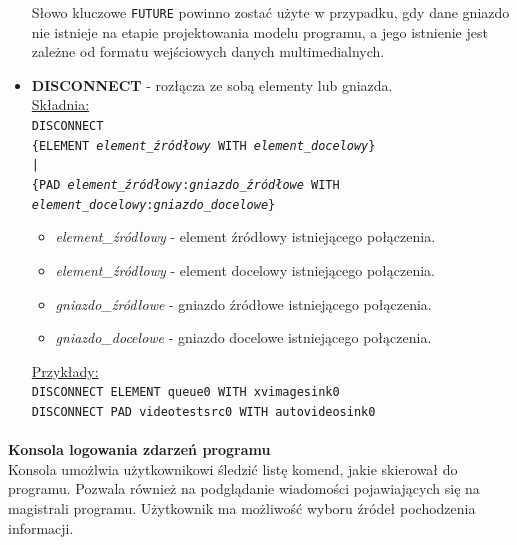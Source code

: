 \documentclass[12pt]{article}
\begin{document}
\begin{itemize}
Słowo kluczowe \texttt{FUTURE} powinno zostać użyte w przypadku, gdy dane gniazdo nie istnieje na etapie projektowania modelu programu, a jego istnienie jest zależne od formatu wejściowych danych multimedialnych.
\item \textbf{DISCONNECT} - rozłącza ze sobą elementy lub gniazda. \\
\underline{Składnia:} \\
\texttt{DISCONNECT \\
\hspace*{2em} \{ELEMENT \textit{element\_źródłowy} WITH \textit{element\_docelowy}\} \\
\hspace*{2em} | \\
\hspace*{2em} \{PAD \textit{element\_źródłowy}:\textit{gniazdo\_źródłowe} WITH \\
\hspace*{4em} \textit{element\_docelowy}:\textit{gniazdo\_docelowe}\}
}
\begin{itemize}
 \setlength{\itemsep}{0em}
\item \textit{element\_źródłowy} - element źródłowy istniejącego połączenia.
\item \textit{element\_źródłowy} - element docelowy istniejącego połączenia.
\item \textit{gniazdo\_źródłowe} - gniazdo źródłowe istniejącego połączenia.
\item \textit{gniazdo\_docelowe} - gniazdo docelowe istniejącego połączenia.
\end{itemize}
\underline{Przykłady:} \\
\texttt{DISCONNECT ELEMENT queue0 WITH xvimagesink0} \\
\texttt{DISCONNECT PAD videotestsrc0 WITH autovideosink0}
\end{itemize}\paragraph{}\vspace{-3mm}
\textbf{Konsola logowania zdarzeń programu} \\
Konsola umożlwia użytkownikowi śledzić listę komend, jakie skierował do programu. Pozwala również na podglądanie wiadomości pojawiających się na magistrali programu. Użytkownik ma możliwość wyboru źródeł pochodzenia informacji.
\end{document}
